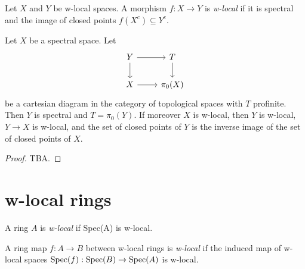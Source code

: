 \begin{definition}
    Let \(X\) and \(Y\) be w-local spaces. A morphism \(f: X \to Y\) is \emph{w-local} if it is spectral and the image of closed points \(f(X^c) \subseteq Y^c\).
    \label{def:w-local-space-map}
    \leanok
\end{definition}

\begin{lemma}
Let $X$ be a spectral space. Let
\[
\begin{tikzcd}
Y \arrow[r] \arrow[d] & T \arrow[d] \\
X \arrow[r] & \pi_0(X)
\end{tikzcd}
\]
be a cartesian diagram in the category of topological spaces with $T$ profinite. Then $Y$ is spectral and $T = \pi_0(Y)$. If moreover $X$ is w-local, then $Y$ is w-local, $Y \to X$ is w-local, and the set of closed points of $Y$ is the inverse image of the set of closed points of $X$.
\label{thm:cartesian-w-local}
\end{lemma}

\begin{proof}
  TBA.
\end{proof}

\section{w-local rings}

\begin{definition}
    A ring \(A\) is \emph{w-local} if Spec(A) is w-local.
    \label{def:w-local-ring}
    \leanok
\end{definition}

\begin{definition}
    A ring map \(f: A \to B\) between w-local rings is \emph{w-local} if the induced map of w-local spaces \(\operatorname{Spec}(f) : \operatorname{Spec}(B) \to \operatorname{Spec}(A)\) is w-local.
    \label{def:w-local-ring-map}
\end{definition}

